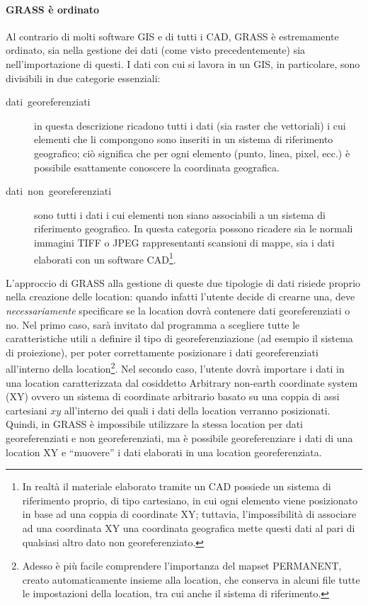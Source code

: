 			\paragraph*{GRASS è ordinato\label{par:GRASS-=0000E8-ordinato}}
				Al contrario di molti software GIS e di tutti i CAD, GRASS è estremamente ordinato, sia nella gestione dei dati (come visto precedentemente) sia nell'importazione di questi. I dati con cui si lavora in un GIS, in particolare, sono divisibili in due categorie essenziali:
				
				\begin{description}
					\item [{dati~georeferenziati}] in questa descrizione ricadono tutti i dati (sia raster che vettoriali) i cui elementi che li compongono sono inseriti in un sistema di riferimento geografico; ciò significa che per ogni elemento (punto, linea, pixel, ecc.) è possibile esattamente conoscere la coordinata geografica.
					\item [{dati~non~georeferenziati}] sono tutti i dati i cui elementi non siano associabili a un sistema di riferimento geografico. In questa categoria possono ricadere sia le normali immagini TIFF o JPEG rappresentanti scansioni di mappe, sia i dati elaborati con un software CAD\footnote{In realtà il materiale elaborato tramite un CAD possiede un sistema di riferimento proprio, di tipo cartesiano, in cui ogni elemento viene posizionato in base ad una coppia di coordinate XY; tuttavia, l'impossibilità di associare ad una coordinata XY una coordinata geografica mette questi dati al pari di qualsiasi altro dato non georeferenziato.}.
				\end{description}
				
				L'approccio di GRASS alla gestione di queste due tipologie di dati risiede proprio nella creazione delle location: quando infatti l'utente decide di crearne una, deve \emph{necessariamente} specificare se la location dovrà contenere dati georeferenziati o no. Nel primo caso, sarà invitato dal programma a scegliere tutte le caratteristiche utili a definire il tipo di georeferenziazione (ad esempio il sistema di proiezione), per poter correttamente posizionare i dati georeferenziati all'interno della location\footnote{Adesso è più facile comprendere l'importanza del mapset PERMANENT, creato automaticamente insieme alla location, che conserva in alcuni file tutte le impostazioni della location, tra cui anche il sistema di riferimento.}. Nel secondo caso, l'utente dovrà importare i dati in una location caratterizzata dal cosiddetto \textsf{Arbitrary non-earth coordinate system (XY)} ovvero un sistema di coordinate arbitrario basato su una coppia di assi cartesiani $xy$ all'interno dei quali i dati della location verranno posizionati. Quindi, in GRASS è impossibile utilizzare la stessa location per dati georeferenziati e non georeferenziati, ma è possibile georeferenziare i dati di una location XY e ``muovere'' i dati elaborati in una location georeferenziata.


